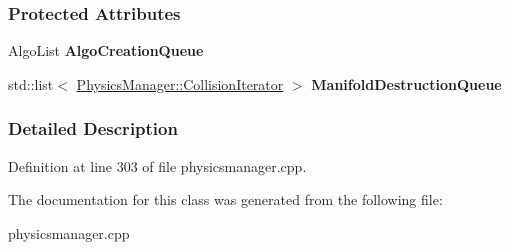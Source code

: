 \subsubsection*{Protected Attributes}
\begin{DoxyCompactItemize}
\item 
\hypertarget{classMezzanine_1_1CollisionDispatcher_a124864848dcdbf42a92b45b3cca2137e}{
AlgoList {\bfseries AlgoCreationQueue}}
\label{classMezzanine_1_1CollisionDispatcher_a124864848dcdbf42a92b45b3cca2137e}

\item 
\hypertarget{classMezzanine_1_1CollisionDispatcher_abec245f674a643a070fb7b87f96cfc79}{
std::list$<$ \hyperlink{classMezzanine_1_1PhysicsManager_a930a032df1bf01b9f93ba4e815a433c2}{PhysicsManager::CollisionIterator} $>$ {\bfseries ManifoldDestructionQueue}}
\label{classMezzanine_1_1CollisionDispatcher_abec245f674a643a070fb7b87f96cfc79}

\end{DoxyCompactItemize}


\subsubsection{Detailed Description}


Definition at line 303 of file physicsmanager.cpp.



The documentation for this class was generated from the following file:\begin{DoxyCompactItemize}
\item 
physicsmanager.cpp\end{DoxyCompactItemize}
